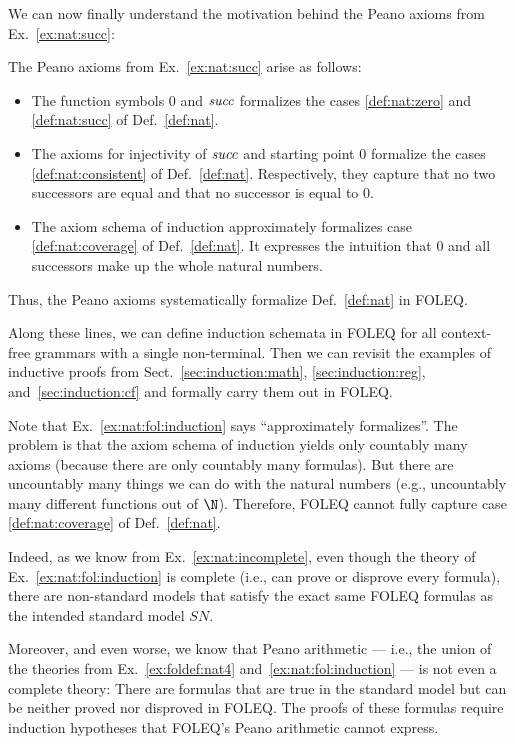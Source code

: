 We can now finally understand the motivation behind the Peano axioms from Ex.~\ref{ex:nat:succ}:

\begin{example}\label{ex:nat:fol:induction}
The Peano axioms from Ex.~\ref{ex:nat:succ} arise as follows:
\begin{itemize}
\item The function symbols $0$ and $\mathit{succ}$ formalizes the cases \ref{def:nat:zero} and \ref{def:nat:succ} of Def.~\ref{def:nat}.
\item The axioms for injectivity of $\mathit{succ}$ and starting point $0$ formalize the cases \ref{def:nat:consistent} of Def.~\ref{def:nat}.
  Respectively, they capture that no two successors are equal and that no successor is equal to $0$.
\item The axiom schema of induction approximately formalizes case \ref{def:nat:coverage} of Def.~\ref{def:nat}.
  It expresses the intuition that $0$ and all successors make up the whole natural numbers.
\end{itemize}
Thus, the Peano axioms systematically formalize Def.~\ref{def:nat} in FOLEQ.
\end{example}

Along these lines, we can define induction schemata in FOLEQ for all context-free grammars with a single non-terminal.
Then we can revisit the examples of inductive proofs from Sect.~\ref{sec:induction:math}, \ref{sec:induction:reg}, and~\ref{sec:induction:cf} and formally carry them out in FOLEQ.

\begin{remark}\label{ex:nat:fol:incomplete}
Note that Ex.~\ref{ex:nat:fol:induction} says ``approximately formalizes''.
The problem is that the axiom schema of induction yields only countably many axioms (because there are only countably many formulas).
But there are uncountably many things we can do with the natural numbers (e.g., uncountably many different functions out of $\N$).
Therefore, FOLEQ cannot fully capture case \ref{def:nat:coverage} of Def.~\ref{def:nat}.

Indeed, as we know from Ex.~\ref{ex:nat:incomplete}, even though the theory of Ex.~\ref{ex:nat:fol:induction} is complete (i.e., can prove or disprove every formula), there are non-standard models that satisfy the exact same FOLEQ formulas as the intended standard model $SN$.

Moreover, and even worse, we know that Peano arithmetic --- i.e., the union of the theories from Ex.~\ref{ex:foldef:nat4} and~\ref{ex:nat:fol:induction} --- is not even a complete theory:
There are formulas that are true in the standard model but can be neither proved nor disproved in FOLEQ.
The proofs of these formulas require induction hypotheses that FOLEQ's Peano arithmetic cannot express.
\end{remark}
